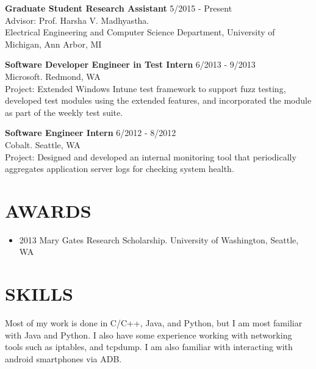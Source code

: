 \documentclass[zhemargin]{res}
\begin{document}
\begin{resume}
    \textbf{Graduate Student Research Assistant} \hfill 5/2015 - Present \\
    Advisor: Prof. Harsha V. Madhyastha.\\
    Electrical Engineering and Computer Science Department, University of Michigan, Ann Arbor, MI

    \textbf{Software Developer Engineer in Test Intern} \hfill 6/2013 - 9/2013 \\
    Microsoft. Redmond, WA\\
    Project: Extended Windows Intune test framework to support fuzz testing, developed test modules using the extended features, and incorporated the module as part of the weekly test suite.

    \textbf{Software Engineer Intern} \hfill 6/2012 - 8/2012 \\
    Cobalt. Seattle, WA\\
    Project: Designed and developed an internal monitoring tool that periodically aggregates application server logs for checking system health.

\section{\small AWARDS}
	\begin{itemize}[leftmargin=*, topsep=-10pt] %
    \item 2013 Mary Gates Research Scholarship. University of Washington, Seattle, WA
	\end{itemize}

\section{\small SKILLS}
	Most of my work is done in C/C++, Java, and Python, but I am most familiar 
  with Java and Python. I also have some experience working with networking 
  tools such as iptables, and tcpdump. I am also familiar with interacting 
  with android smartphones via ADB.

\end{resume}
\end{document}
